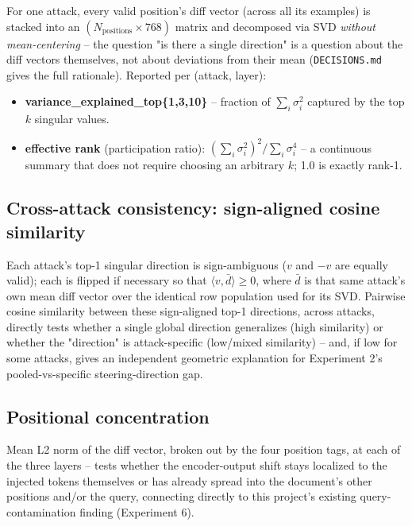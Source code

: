 \documentclass[11pt]{article}
\begin{document}
For one attack, every valid position's diff vector (across all its
examples) is stacked into an $(N_{\text{positions}} \times 768)$ matrix and
decomposed via SVD \emph{without mean-centering} -- the question "is there
a single direction" is a question about the diff vectors themselves, not
about deviations from their mean (\texttt{DECISIONS.md} gives the full
rationale). Reported per (attack, layer):
\begin{itemize}
  \item \textbf{variance\_explained\_top\{1,3,10\}} -- fraction of
  $\sum_i \sigma_i^2$ captured by the top $k$ singular values.
  \item \textbf{effective rank} (participation ratio):
  $\left(\sum_i \sigma_i^2\right)^2 \big/ \sum_i \sigma_i^4$ -- a
  continuous summary that does not require choosing an arbitrary $k$; 1.0
  is exactly rank-1.
\end{itemize}

\subsection{Cross-attack consistency: sign-aligned cosine similarity}

Each attack's top-1 singular direction is sign-ambiguous
($v$ and $-v$ are equally valid); each is flipped if necessary so that
$\langle v, \bar{d}\rangle \geq 0$, where $\bar d$ is that same attack's own
mean diff vector over the identical row population used for its SVD.
Pairwise cosine similarity between these sign-aligned top-1 directions,
across attacks, directly tests whether a single global direction
generalizes (high similarity) or whether the "direction" is attack-specific
(low/mixed similarity) -- and, if low for some attacks, gives an
independent geometric explanation for Experiment 2's pooled-vs-specific
steering-direction gap.

\subsection{Positional concentration}
\label{sec:posconc}

Mean L2 norm of the diff vector, broken out by the four position tags, at
each of the three layers -- tests whether the encoder-output shift stays
localized to the injected tokens themselves or has already spread into the
document's other positions and/or the query, connecting directly to this
project's existing query-contamination finding (Experiment 6).

\end{document}
